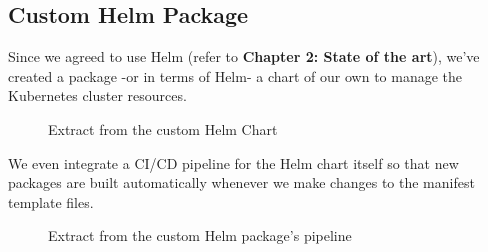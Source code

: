 
\subsection{Custom Helm Package}
Since we agreed to use Helm (refer to \textbf{Chapter 2: State of the art}), we've created a package -or in terms of Helm- a chart of our own to manage the Kubernetes cluster resources.

\begin{figure}[H]
    \centering
    \caption{Extract from the custom Helm Chart}
    \label{fig:extract-from-custom-helm-chart}
\end{figure}

We even integrate a CI/CD pipeline for the Helm chart itself so that new packages are built automatically whenever we make changes to the manifest template files.

\begin{figure}[H]
    \centering
    \caption{Extract from the custom Helm package's pipeline}
    \label{fig:build-package-stage}
\end{figure}

